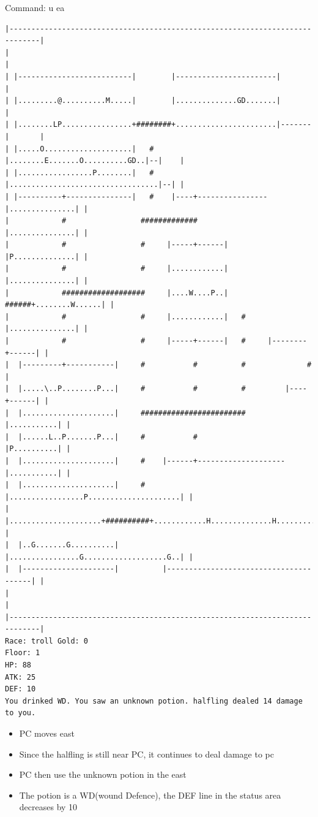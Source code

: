 \documentclass[11pt]{article}
\theoremstyle{plain}
\begin{document}
Command: u ea
\begin{Verbatim}[fontsize=\scriptsize]
|-----------------------------------------------------------------------------|
|                                                                             |
| |--------------------------|        |-----------------------|               |
| |.........@..........M.....|        |..............GD.......|               |
| |........LP................+########+.......................|-------|       |
| |.....O....................|   #    |........E.......O..........GD..|--|    |
| |.................P........|   #    |..................................|--| |
| |----------+---------------|   #    |----+----------------|...............| |
|            #                 #############                |...............| |
|            #                 #     |-----+------|         |P..............| |
|            #                 #     |............|         |...............| |
|            ###################     |....W....P..|   ######+........W......| |
|            #                 #     |............|   #     |...............| |
|            #                 #     |-----+------|   #     |--------+------| |
|  |---------+-----------|     #           #          #              #        |
|  |.....\..P........P...|     #           #          #         |----+------| |
|  |.....................|     ########################         |...........| |
|  |......L..P.......P...|     #           #                    |P..........| |
|  |.....................|     #    |------+--------------------|...........| |
|  |.....................|     #    |.................P.....................| |
|  |.....................+##########+............H..............H...........| |
|  |..G.......G..........|          |................G...................G..| |
|  |---------------------|          |---------------------------------------| |
|                                                                             |
|-----------------------------------------------------------------------------|
Race: troll Gold: 0                                                    Floor: 1
HP: 88
ATK: 25
DEF: 10
You drinked WD. You saw an unknown potion. halfling dealed 14 damage to you. 
\end{Verbatim}
\begin{itemize}
	\item PC moves east
    \item Since the halfling is still near PC, it continues to deal damage to pc
    \item PC then use the unknown potion in the east
    \item The potion is a WD(wound Defence), the DEF line in the status area decreases by 10
\end{itemize}
\end{document}

